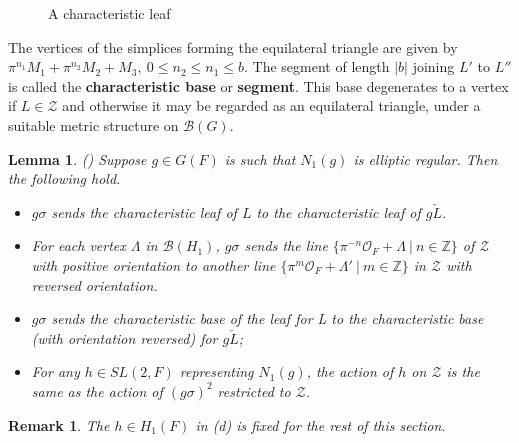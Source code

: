 \documentclass[12pt,letterpaper]{amsart}
\numberwithin{equation}{section}
\newtheorem{lemma}[theorem]{Lemma}
\newtheorem{remark}{Remark}
\theoremstyle{definition}
\theoremstyle{plain}
\providecommand{\cal}{\mathcal}
\def\zz{{\cal Z}}
\def\zzz{\mathbb{Z}}
\def\off{{\cal O}_F}
\def\bbg{{\cal B}(G)}
\def\bbH1{{\cal B}(H_1)}
\begin{document}
\begin{figure}[htbp]
\centering
{}
\caption{A characteristic leaf \label{fig:4.8}}
\end{figure}

\noindent
The vertices of the simplices forming the equilateral triangle
are given by
$\pi^{n_1}M_1 +\pi^{n_2}M_2 + M_3,\ 0 \leq n_2 \leq n_1 \leq b$.
The segment of length $|b|$ joining $L'$ to $L''$ is called the
{\bf characteristic base} or {\bf segment}. This base degenerates to a
vertex if $L \in \zz$ and otherwise it may be regarded as 
an equilateral triangle, under a suitable metric structure on $\bbg$.

\begin{lemma}
\label{lemma:4.9} 
(\cite{LaUn}) 
Suppose $g\in G(F)$ is such that $N_1(g)$
is elliptic regular. Then the following hold.

\begin{itemize}
\item[(a)] 
$g\sigma$ sends the characteristic leaf of $L$ to the characteristic leaf
of $g\check{L}$.

\item[(b)] 
For each vertex $\Lambda$ in $\bbH1$, $g\sigma$ sends the line 
$\{\pi^{-n}\off +\Lambda\ |\ n\in \zzz\}$
of $\zz$ with positive orientation to another line 
$\{\pi^m\off +\Lambda ' \ |\ m \in \zzz\}$ in
$\zz$ with reversed orientation.

\item[(c)] 
$g\sigma$ sends the characteristic base of the leaf for L to the
characteristic base (with orientation reversed) for $g\check{L}$;

\item[(d)] 
For any $h\in SL(2,F)$ representing $N_1(g)$, the action of
$h$ on $\zz$ is the same as the action of $(g\sigma)^2$ restricted
to $\zz$.
\end{itemize}
\end{lemma}

\begin{remark}
The $h \in H_1(F)$ in (d) is fixed for the rest of this section.
\end{remark}
\end{document}
